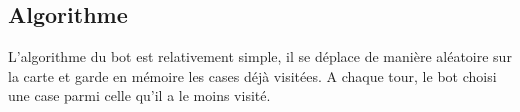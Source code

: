 \subsection{Algorithme}

L'algorithme du bot est relativement simple, il se déplace de manière aléatoire sur la carte et garde en mémoire les cases déjà visitées. A chaque tour, le bot choisi une case parmi celle qu'il a le moins visité. 

\subsection{}
